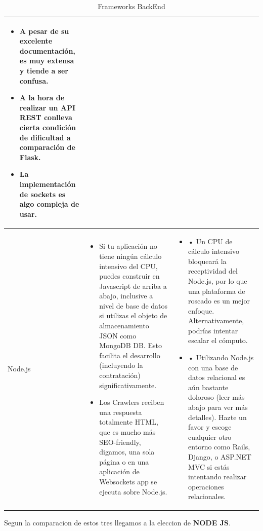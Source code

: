 \documentclass[a4paper,12 pt]{article}
\begin{document}
\begin{table}[H]
{\begin{tabular}{|M{2.5cm}|M{6.5cm}|M{6.5cm}|}
\begin{itemize}
                \item A pesar de su excelente documentación, es muy extensa y
                tiende a ser confusa.
                \item A la hora de realizar un API REST conlleva cierta
                condición de dificultad a comparación de Flask.
                \item La implementación de sockets es algo compleja de usar.
            \end{itemize}
            \\
        \hline
            Node.js  &
            \begin{itemize}
                \item Si tu aplicación no tiene ningún cálculo intensivo del
                CPU, puedes construir en Javascript de arriba a abajo, inclusive
                a nivel de base de datos si utilizas el objeto de almacenamiento
                JSON como MongoDB DB. Esto facilita el desarrollo (incluyendo la
                contratación) significativamente.
                \item Los Crawlers reciben una respuesta totalmente HTML, que es
                mucho más SEO-friendly, digamos, una sola página o en una
                aplicación de Websockets app se ejecuta sobre Node.js.
            \end{itemize}   &
            \begin{itemize}
                \item • Un CPU de cálculo intensivo bloqueará la receptividad
                del Node.js, por lo que una plataforma de roscado es un mejor
                enfoque. Alternativamente, podrías intentar escalar el cómputo.
                \item • Utilizando Node.js con una base de datos relacional es
                aún bastante doloroso (leer más abajo para ver más detalles).
                Hazte un favor y escoge cualquier otro entorno como Rails,
                Django, o ASP.NET MVC si estás intentando realizar operaciones
                relacionales.
            \end{itemize}
            \\
        \hline
            
    \end{tabular}
    \caption{Frameworks BackEnd}
    }
\end{table}{}

Segun la comparacion de estos tres llegamos a la eleccion de \textbf{NODE JS}.\\
\end{document}
